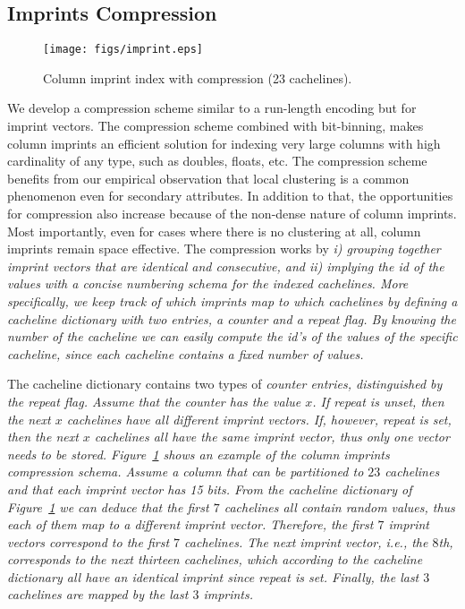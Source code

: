 \subsection{Imprints Compression}\label{subsec:comp}

\begin{figure}
\centering\texttt{[image: figs/imprint.eps]}
\caption{Column imprint index with compression (23 cachelines).}
\label{fig:imprint}
\end{figure}

We develop a compression scheme similar to a run-length encoding but for
imprint vectors. The compression scheme combined with bit-binning, makes column
imprints an efficient solution for indexing very large columns with high
cardinality of any type, such as doubles, floats, etc. The compression scheme
benefits from our empirical observation that local clustering is a common
phenomenon even for secondary attributes. In addition to that, the opportunities
for compression also increase because of the non-dense nature of column
imprints. Most importantly, even for cases where there is no clustering at all,
column imprints remain space effective. The compression works by \it{i)}
grouping together imprint vectors that are identical and consecutive, and
\it{ii)} implying the \it{id} of the values with a concise numbering schema for
the indexed cachelines. More specifically, we keep track of which imprints map
to which cachelines by defining a \it{cacheline dictionary} with two entries,
a \it{counter} and a \it{repeat} flag. By knowing the number of the cacheline
we can easily compute the \it{id}'s of the values of the specific cacheline,
since each cacheline contains a fixed number of values.

The cacheline dictionary contains two types of \it{counter} entries,
distinguished by the \it{repeat} flag. Assume that the \it{counter} has the
value $x$. If \it{repeat} is unset, then the next $x$
cachelines have all different imprint vectors. If, however, \it{repeat} is
\it{set},
then the next $x$ cachelines all have the same imprint vector, thus only one
vector needs to be stored. Figure~\ref{fig:imprint} shows an example of the
column imprints compression schema. Assume a column that can be partitioned
to $23$ cachelines and that each imprint vector has 15 bits. From the
\it{cacheline dictionary} of Figure~\ref{fig:imprint} we can deduce that the
first $7$ cachelines all contain random values, thus each of them map to a
different imprint vector. Therefore, the first $7$ imprint vectors correspond
to the first $7$ cachelines. The next imprint vector, i.e., the $8$th,
corresponds to the next thirteen cachelines, which according to the cacheline
dictionary all have an identical imprint since \it{repeat} is set.
Finally, the last $3$ cachelines are mapped by the last $3$ imprints.


